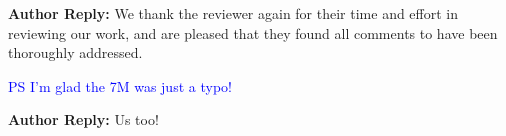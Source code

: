 \documentclass[11pt,a4paper]{letter} %
\begin{document}
\textbf{Author Reply:} We thank the reviewer again for their time and effort in reviewing our work, and are pleased that they found all comments to have been thoroughly addressed.

\textcolor{blue}{
PS I'm glad the 7M was just a typo!
}

\textbf{Author Reply:} Us too!


\clearpage
\newpage



\end{document}
